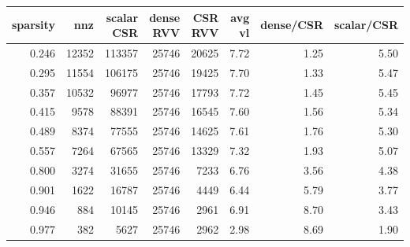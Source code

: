 \begin{tabular}{rrrrrrrr}
\toprule
sparsity & nnz & scalar CSR & dense RVV & CSR RVV & avg vl & dense/CSR & scalar/CSR \\
\midrule
0.246 & 12352 & 113357 & 25746 & 20625 & 7.72 & 1.25 & 5.50 \\
0.295 & 11554 & 106175 & 25746 & 19425 & 7.70 & 1.33 & 5.47 \\
0.357 & 10532 & 96977 & 25746 & 17793 & 7.72 & 1.45 & 5.45 \\
0.415 & 9578 & 88391 & 25746 & 16545 & 7.60 & 1.56 & 5.34 \\
0.489 & 8374 & 77555 & 25746 & 14625 & 7.61 & 1.76 & 5.30 \\
0.557 & 7264 & 67565 & 25746 & 13329 & 7.32 & 1.93 & 5.07 \\
0.800 & 3274 & 31655 & 25746 & 7233 & 6.76 & 3.56 & 4.38 \\
0.901 & 1622 & 16787 & 25746 & 4449 & 6.44 & 5.79 & 3.77 \\
0.946 & 884 & 10145 & 25746 & 2961 & 6.91 & 8.70 & 3.43 \\
0.977 & 382 & 5627 & 25746 & 2962 & 2.98 & 8.69 & 1.90 \\
\bottomrule
\end{tabular}
